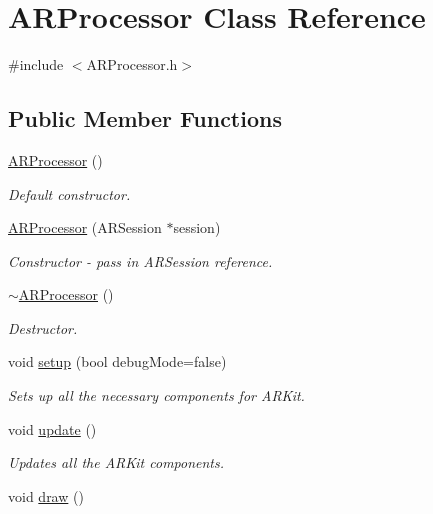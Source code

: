 \hypertarget{class_a_r_processor}{}\section{A\+R\+Processor Class Reference}
\label{class_a_r_processor}


{\ttfamily \#include $<$A\+R\+Processor.\+h$>$}

\subsection*{Public Member Functions}
\begin{DoxyCompactItemize}
\item 
\hyperlink{class_a_r_processor_a8d82301cb64ffc49af9219daeabc9347}{A\+R\+Processor} ()
\begin{DoxyCompactList}\small\item\em Default constructor. \end{DoxyCompactList}\item 
\hyperlink{class_a_r_processor_a2dda14173a82870379c111d13a0562d6}{A\+R\+Processor} (A\+R\+Session $\ast$session)
\begin{DoxyCompactList}\small\item\em Constructor -\/ pass in A\+R\+Session reference. \end{DoxyCompactList}\item 
\hyperlink{class_a_r_processor_a9bd83aa6f017e308d1e55e709621ae84}{$\sim$\+A\+R\+Processor} ()
\begin{DoxyCompactList}\small\item\em Destructor. \end{DoxyCompactList}\item 
void \hyperlink{class_a_r_processor_a1a41547daccb7c6810bc2693ea6d5487}{setup} (bool debug\+Mode=false)
\begin{DoxyCompactList}\small\item\em Sets up all the necessary components for A\+R\+Kit. \end{DoxyCompactList}\item 
void \hyperlink{class_a_r_processor_a76b6cbb62dcc0aa87e38e48cc8dbe621}{update} ()
\begin{DoxyCompactList}\small\item\em Updates all the A\+R\+Kit components. \end{DoxyCompactList}\item 
void \hyperlink{class_a_r_processor_a20418bd305702c3346a109da9e1afcb0}{draw} ()

\end{DoxyCompactItemize}
